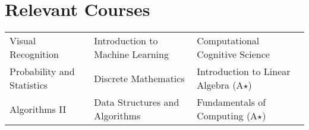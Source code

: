 \setlength\extrarowheight{3pt}  %

\section*{Relevant Courses}
\begin{tabularx}{\textwidth}{L L L}
    Visual Recognition &
    Introduction to Machine Learning &
    Computational Cognitive Science \\
    Probability and Statistics &
    Discrete Mathematics &
    Introduction to Linear Algebra (A$\star$) \\
    Algorithms II &
    Data Structures and Algorithms &
    Fundamentals of Computing (A$\star$)
\end{tabularx}
